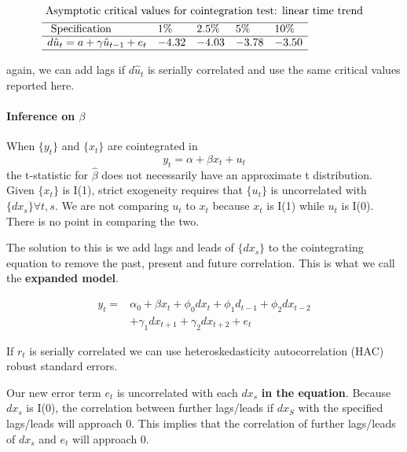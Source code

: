 \documentclass[11pt]{article}
\begin{document}
\begin{equation}
\begin{aligned}
&\text { Asymptotic critical values for cointegration test: linear time trend }\\
&\begin{array}{lllll}
\hline \text { Specification } & 1 \% & 2.5 \% & 5 \% & 10 \% \\
\hline d \hat{u}_t=a+\gamma \hat{u}_{t-1}+e_t & -4.32 & -4.03 & -3.78 & -3.50 \\
\hline
\end{array}
\end{aligned}
\end{equation}

again, we can add lags if $d\hat{u}_t$ is serially correlated and use the same critical values reported here.

\paragraph{Inference on $\beta$} \mbox{}

When $\{y_t\}$ and $\{x_t\}$ are cointegrated in
\[y_t = \alpha + \beta x_t + u_t\]
the t-statistic for $\hat{\beta}$ does not necessarily have an approximate t distribution. Given $\{x_t\}$ is I(1), strict exogeneity requires that $\{u_t\}$ is uncorrelated with $\{dx_s\} \forall t,s$. We are not comparing $u_t$ to $x_t$ because $x_t$ is I(1) while $u_t$ is I(0). There is no point in comparing the two.

The solution to this is we add lags and leads of $\{dx_s\}$ to the cointegrating equation to remove the past, present and future correlation. This is what we call the \textbf{expanded model}.

\begin{equation}
\begin{aligned}
y_t= & \alpha_0+\beta x_t+\phi_0 d x_t+\phi_1 d_{t-1}+\phi_2 d x_{t-2} \\
& +\gamma_1 d x_{t+1}+\gamma_2 d x_{t+2}+e_t
\end{aligned}
\end{equation}

If $r_t$ is serially correlated we can use heteroskedasticity autocorrelation (HAC) robust standard errors.

 Our new error term $e_t$ is uncorrelated with each $dx_s$ \textbf{in the equation}. Because $dx_s$ is I(0), the correlation between further lags/leads if $dx_S$ with the specified lags/leads will approach 0. This implies that the correlation of further lags/leads of $dx_s$ and $e_t$ will approach 0.
\end{document}
